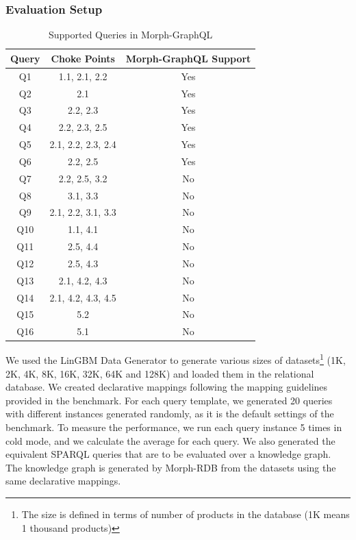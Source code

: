 \subsubsection{Evaluation Setup}
\begin{table}[!ht]
 \centering
  \caption[Morph-GraphQL supported LinGBM queries]{Supported Queries in Morph-GraphQL}
 \label{table:supported-queries}
  \begin{tabular}{c | c | c} 
  \toprule
   Query & Choke Points & Morph-GraphQL Support  \\
 \midrule
  Q1 & 1.1, 2.1, 2.2 & Yes   \\ 
  Q2 & 2.1 & Yes  \\
  Q3 & 2.2, 2.3 & Yes   \\
  Q4 & 2.2, 2.3, 2.5 & Yes  \\
  Q5 & 2.1, 2.2, 2.3, 2.4 & Yes  \\ 
  Q6 & 2.2, 2.5 & Yes   \\ 
  Q7 & 2.2, 2.5, 3.2 & No    \\ 
  Q8 & 3.1, 3.3 & No    \\ 
  Q9 & 2.1, 2.2, 3.1, 3.3 & No    \\ 
  Q10 & 1.1, 4.1 & No   \\ 
  Q11 & 2.5, 4.4 & No   \\ 
  Q12 & 2.5, 4.3 & No   \\ 
  Q13 & 2.1, 4.2, 4.3 & No   \\ 
  Q14 & 2.1, 4.2, 4.3, 4.5 & No   \\ 
  Q15 & 5.2 & No   \\ 
  Q16 & 5.1 & No   \\ 
  \bottomrule
  \end{tabular}
 
 \end{table}
We used the LinGBM Data Generator to generate various sizes of datasets\footnote{The size is defined in terms of number of products in the database (1K means 1 thousand products)} (1K, 2K, 4K, 8K, 16K, 32K, 64K and 128K) and loaded them in the relational database. We created declarative mappings following the mapping guidelines provided in the benchmark. For each query template, we generated 20 queries with different instances generated randomly, as it is the default settings of the benchmark. To measure the performance, we run each query instance 5 times in cold mode, and we calculate the average for each query. We also generated the equivalent SPARQL queries that are to be evaluated over a knowledge graph. The knowledge graph is generated by Morph-RDB \citep{priyatna2014formalisation} from the datasets using the same declarative mappings. 
